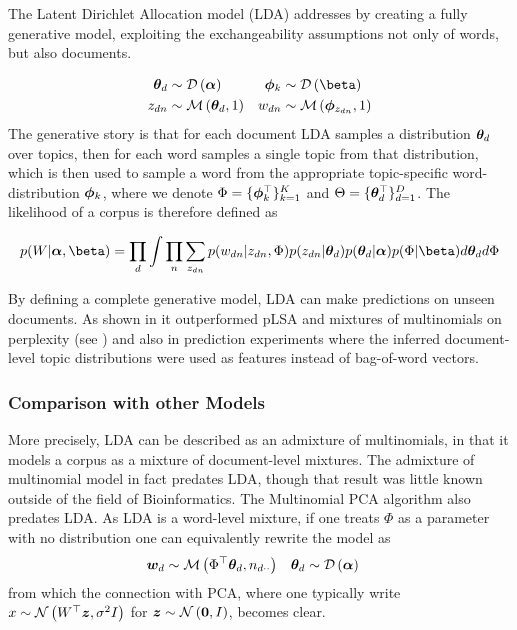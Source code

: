 The Latent Dirichlet Allocation model\cite{BleiNgJordan2003} (LDA) addresses by creating a fully generative model, exploiting the exchangeability assumptions not only of words, but also documents.

\begin{align}
\thd & \sim \dir{\vv{\alpha}} & \pk & \sim \dir{\vv{\beta}} \\
z_{dn} & \sim \muln{\thd}{1} & w_{dn} & \sim \muln{\vv{\phi}_{z_{dn}}}{1}
\end{align}
The generative story is that for each document LDA samples a distribution ${ \bm \theta_d }$ over topics, then for each word samples a single topic from that distribution, which is then used to sample a word from the appropriate topic-specific word-distribution ${ \bm \phi_k }$, where we denote $\Phi = \{ \bm \phi_k^\top \}_{k=1}^K$ and $\Theta = \{ \bm \theta_d^\top \}_{d=1}^D$. The likelihood of a corpus is therefore defined as

\begin{align}
p(W | \vv{\alpha}, \vv{\beta}) = \prod_d \int \prod_n \sum_{z_{dn}} p(w_{dn}|z_{dn}, \Phi)p(z_{dn}|\thd)p(\thd|\vv{\alpha})p(\Phi|\vv{\beta}) d\thd d\Phi
\end{align}



By defining a complete generative model, LDA can make predictions on unseen documents. As shown in \cite{BleiNgJordan2003} it outperformed pLSA and mixtures of multinomials on perplexity (see ) and also in prediction experiments where the inferred document-level topic distributions were used as features instead of bag-of-word vectors.

\subsubsection{Comparison with other Models}
More precisely, LDA can be described as an admixture of multinomials, in that it models a corpus as a mixture of document-level mixtures. The admixture of multinomial model\cite{Pritchard2000} in fact predates LDA, though that result was little known outside of the field of Bioinformatics. The Multinomial PCA algorithm\cite{Buntine2002} also predates LDA. As LDA is a word-level mixture, if one treats $\Phi$ as a parameter with no distribution one can equivalently rewrite the model as
\begin{align}
{  \bm w _d } & \sim \mathcal{M} \left( {\Phi^\top{  \bm \theta _d }},{n_{d\cdot\cdot}} \right) & { \bm \theta_d } & \sim \mathcal{D} \left( {\bm \alpha} \right)
\end{align}
from which the connection with PCA, where one typically write $x \sim \mathcal{N} \left( {W^\top\bm z}, {\sigma^2 I} \right)$ for $\bm z \sim \mathcal{N} \left( {\bm 0}, {I} \right)$, becomes clear.

